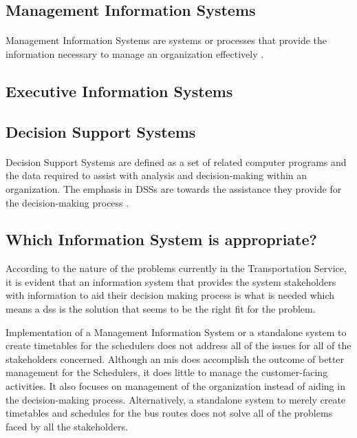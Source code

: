 \subsection{Management Information Systems}

\paragraph{} Management Information Systems are systems or processes that provide the information necessary to manage an organization effectively \cite{Comptroller1995, TexasAMUni2012}. 

\subsection{Executive Information Systems}

\paragraph{} 

\subsection{Decision Support Systems}
\label{section-DSSIntro}

\paragraph{} Decision Support Systems are defined as a set of related computer programs and the data required to assist with analysis and decision-making within an organization. The emphasis in DSSs are towards the assistance they provide for the decision-making process \cite{Turban2005}.

\subsection{Which Information System is appropriate?}

According to the nature of the problems currently in the Transportation Service, it is evident that an information system that provides the system stakeholders with information to aid their decision making process is what is needed which means a \acrshort{dss} is the solution that seems to be the right fit for the problem.

Implementation of a Management Information System or a standalone system to create timetables for the schedulers does not address all of the issues for all of the stakeholders concerned. Although an \acrshort{mis} does accomplish the outcome of better management for the Schedulers, it does little to manage the customer-facing activities. It also focuses on management of the organization instead of aiding in the decision-making process. Alternatively, a standalone system to merely create timetables and schedules for the bus routes does not solve all of the problems faced by all the stakeholders. 

